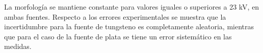 \documentclass{sciposter}
\begin{document}
\begin{multicols}{3}
	 La morfología se mantiene constante para valores iguales o superiores a 23 kV, en ambas fuentes. Respecto a los errores experimentales se muestra que la incertidumbre para la fuente de tungsteno es completamente aleatoria, mientras que para el caso de la fuente de plata se tiene un error sistemático en las medidas.
	 

\small


\end{multicols}
\end{document}
